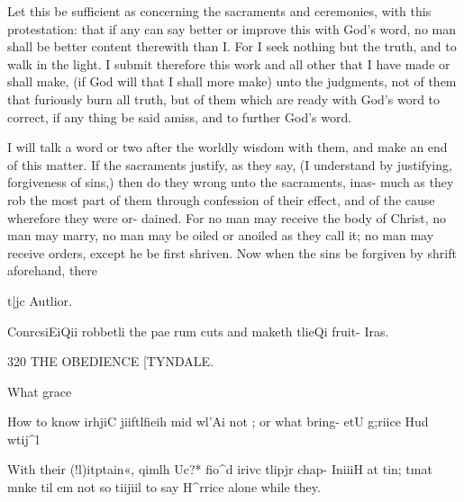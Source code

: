 \documentclass{custom}
\begin{document}
{Let this be sufficient as concerning the sacraments and
ceremonies, with this protestation: that if any can say 
better or improve this with God's word, no man shall be 
better content therewith than I. For I seek nothing but 
the truth, and to walk in the light. I submit therefore this 
work and all other that I have made or shall make, (if 
God will that I shall more make) unto the judgments, 
not of them that furiously burn all truth, but of them 
which are ready with God's word to correct, if any thing 
be said amiss, and to further God's word. 

I will talk a word or two after the worldly wisdom with 
them, and make an end of this matter. If the sacraments 
justify, as they say, (I understand by justifying, forgiveness 
of sins,) then do they wrong unto the sacraments, inas- 
much as they rob the most part of them through confession 
of their effect, and of the cause wherefore they were or- 
dained. For no man may receive the body of Christ, no 
man may marry, no man may be oiled or anoiled as they call 
it; no man may receive orders, except he be first shriven. 
Now when the sins be forgiven by shrift aforehand, there 

t|jc Autlior. 

ConrcsiEiQii 
robbetli the 
pae rum cuts 
and maketh 
tlieQi fruit- 
Iras. 


320
THE OBEDIENCE
[TYNDALE.

What grace 

How to 
know irhjiC 
jiiftlfieih 
mid wl'Ai 
not ; or 
what bring- 
etU g;riice 
Hud wtij^l 

With their 
(!l)itptain«, 
qimlh Uc?* 
fio^d irivc 
tlipjr chap- 
IniiiH at tin; 
tmat mnke 
til em not so 
tiijiil to say 
H^rrice 
alone while 
they. 

}
\end{document}
